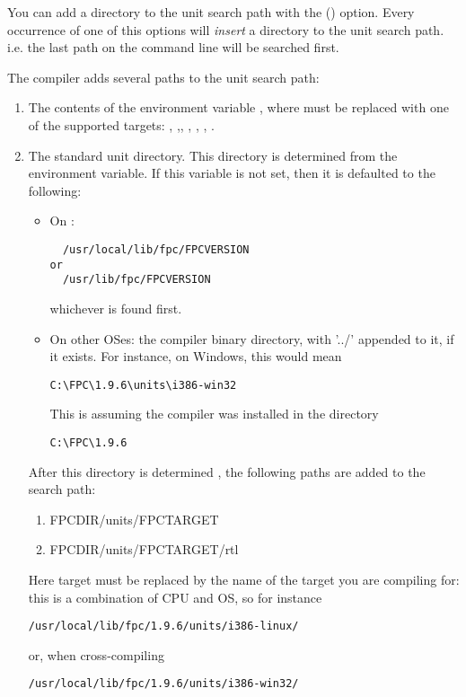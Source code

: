 You can add a directory to the unit search path with the ()
option. Every occurrence of one of this options will {\em insert}
a directory to the unit search path. i.e. the last path on the command line
will be searched first.

The compiler adds several paths to the unit search path:
\begin{enumerate}
\item The contents of the environment variable , where 
must be replaced with one of the supported targets: ,
,, , , , .
\item The standard unit directory. This directory is determined
from the  environment variable. If this variable is not set,
then it is defaulted to the following:
\begin{itemize}
\item On \linux:
\begin{verbatim}
  /usr/local/lib/fpc/FPCVERSION
or
  /usr/lib/fpc/FPCVERSION
\end{verbatim}
whichever is found first.
\item On other OSes: the compiler binary directory, with '../' appended
to it, if it exists. For instance, on Windows, this would mean
\begin{verbatim}
C:\FPC\1.9.6\units\i386-win32
\end{verbatim}
This is assuming the compiler was installed in the directory
\begin{verbatim}
C:\FPC\1.9.6
\end{verbatim}
\end{itemize}
After this directory is determined , the following paths are added to the
search path:
\begin{enumerate}
\item FPCDIR/units/FPCTARGET
\item FPCDIR/units/FPCTARGET/rtl
\end{enumerate}
Here target must be replaced by the name of the target you are compiling
for: this is a combination of CPU and OS, so for instance
\begin{verbatim}
/usr/local/lib/fpc/1.9.6/units/i386-linux/
\end{verbatim}
or, when cross-compiling
\begin{verbatim}
/usr/local/lib/fpc/1.9.6/units/i386-win32/
\end{verbatim}
\end{enumerate}

